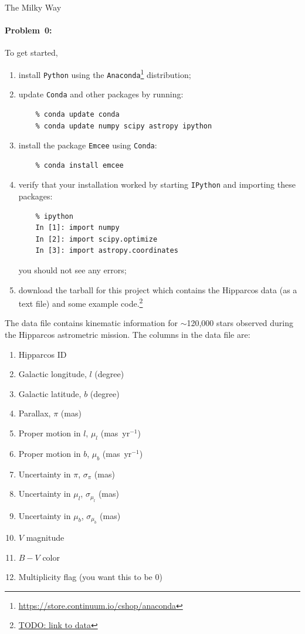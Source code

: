 \documentclass[12pt,twoside]{article}
\newcommand{\projectname}[1]{\begin{center} {\huge {#1}} \end{center}}
\newcommand{\problemname}{Problem}
\newcounter{problem}
\newenvironment{problem0}{\paragraph{\problemname~0:}}{}
\begin{document}
\projectname{The Milky Way}

\begin{problem0}
To get started, 
	\begin{enumerate}
		\item install \texttt{Python} using the \texttt{Anaconda}\footnote{\url{https://store.continuum.io/cshop/anaconda}} distribution;
		\item update \texttt{Conda} and other packages by running:
			\begin{verbatim}
    % conda update conda
    % conda update numpy scipy astropy ipython
			\end{verbatim}
		\item install the package \texttt{Emcee} using \texttt{Conda}:
			\begin{verbatim}
    % conda install emcee
			\end{verbatim}
		\item verify that your installation worked by starting \texttt{IPython} and importing these packages:
			\begin{verbatim}
    % ipython
    In [1]: import numpy
    In [2]: import scipy.optimize
    In [3]: import astropy.coordinates
			\end{verbatim}
			you should not see any errors;
		\item download the tarball for this project which contains the Hipparcos data (as a text file) and some example code.\footnote{\url{TODO: link to data}}
		
	\end{enumerate}
	
The data file contains kinematic information for $\sim$120,000 stars observed during the Hipparcos astrometric mission. The columns in the data file are:
\begin{multicols}{2}
	\begin{enumerate}[align=left,leftmargin=!,label={\bf Col. \arabic*:}]
		\item Hipparcos ID
		\item Galactic longitude, $l$ (degree)
		\item Galactic latitude, $b$ (degree)
		\item Parallax, $\pi$ (mas)
		\item Proper motion in $l$, $\mu_l$ (mas~yr$^{-1}$)
		\item Proper motion in $b$, $\mu_b$ (mas~yr$^{-1}$)
		\item Uncertainty in $\pi$, $\sigma_\pi$ (mas)
		\item Uncertainty in $\mu_l$, $\sigma_{\mu_l}$ (mas)
		\item Uncertainty in $\mu_b$, $\sigma_{\mu_b}$ (mas)
		\item $V$ magnitude
		\item $B-V$ color
		\item Multiplicity flag (you want this to be 0)
	\end{enumerate}
\end{multicols}
\end{problem0}
\end{document}
